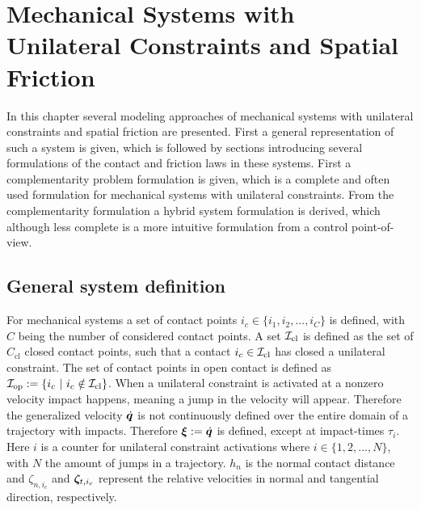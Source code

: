 \documentclass[../DC2017114Bouma.tex]{subfiles}
\begin{document}
\graphicspath{{02_Material/img/}}
\renewcommand{\chaptermark}[1]{\markboth{\thechapter.\ #1}{}}
\renewcommand{\sectionmark}[1]{\markright{#1}{}}
\pagestyle{fancyreport}
\cleartooddpage
\pagestyle{fancyreport}
\chapter{Mechanical Systems with Unilateral Constraints and Spatial Friction}\label{ch:model}
In this chapter several modeling approaches of mechanical systems with unilateral constraints and spatial friction are presented. First a general representation of such a system is given, which is followed by sections introducing several formulations of the contact and friction laws in these systems. First a complementarity problem formulation is given, which is a complete and often used formulation for mechanical systems with unilateral constraints. From the complementarity formulation a hybrid system formulation is derived, which although less complete is a more intuitive formulation from a control point-of-view.
\section{General system definition}
For mechanical systems a set of contact points $i_c\in\{i_1,i_2,...,i_C\}$ is defined, with $C$ being the number of considered contact points. A set $\mathcal{I}_{\text{cl}}$ is defined as the set of $C_{\text{cl}}$ closed contact points, such that a contact $i_c\in\mathcal{I}_{\text{cl}}$ has closed a unilateral constraint. The set of contact points in open contact is defined as $\Ic_{\text{op}} := \{i_c\ |\ i_c\notin\Ic_{\text{cl}}\}$. When a unilateral constraint is activated at a nonzero velocity impact happens, meaning a jump in the velocity will appear. Therefore the generalized velocity $\dot{{\boldsymbol{q}}}$ is not continuously defined over the entire domain of a trajectory with impacts. Therefore $\boldsymbol{\xi}:=\dot{{\boldsymbol{q}}}$ is defined, except at impact-times $\tau_i$. Here $i$ is a counter for unilateral constraint activations where $i\in \{1,2,...,N\}$, with $N$ the amount of jumps in a trajectory. $h_n$ is the normal contact distance and $\zeta_{n,i_c}$ and $\boldsymbol{\zeta}_{t,i_c}$ represent the relative velocities in normal and tangential direction,  respectively. 
\end{document}
